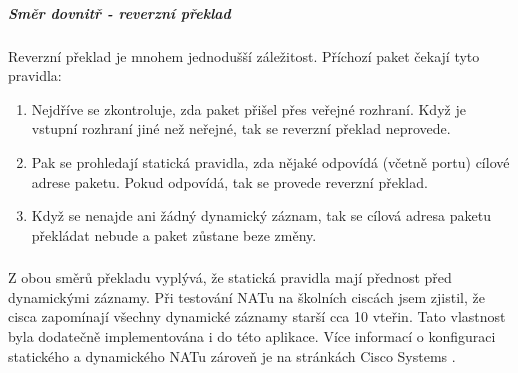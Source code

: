 


\subparagraph{Směr dovnitř - reverzní překlad}

Reverzní překlad je mnohem jednodušší záležitost. Příchozí paket čekají tyto pravidla:
\begin{enumerate}
  \item Nejdříve se zkontroluje, zda paket přišel přes veřejné rozhraní. Když je vstupní rozhraní jiné než neřejné, tak se reverzní překlad neprovede.

  \item Pak se prohledají statická pravidla, zda nějaké odpovídá (včetně portu) cílové adrese paketu. Pokud odpovídá, tak se provede reverzní překlad.

  \item Když se nenajde ani žádný dynamický záznam, tak se cílová adresa paketu překládat nebude a paket zůstane beze změny.
\end{enumerate}


\subsubsection*{}
Z obou směrů překladu vyplývá, že statická pravidla mají přednost před dynamickými záznamy. Při testování NATu na školních ciscách jsem zjistil, že cisca zapomínají všechny dynamické záznamy starší cca 10 vteřin. Tato vlastnost byla dodatečně implementována i do této aplikace. Více informací o konfiguraci statického a dynamického NATu zároveň je na stránkách Cisco Systems \cite{cisco:snat_dnat}.









